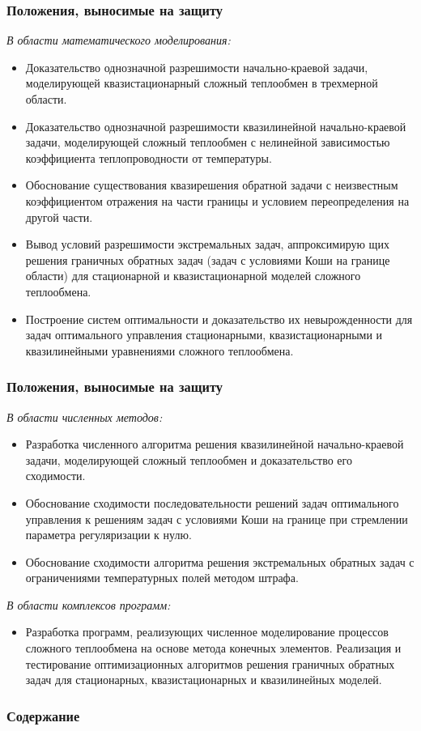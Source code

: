 \begin{frame}
    \frametitle{Положения, выносимые на защиту}
    \textit{В области математического моделирования:}
    \begin{itemize}
        \item Доказательство однозначной разрешимости начально-краевой задачи,
        моделирующей квазистационарный сложный теплообмен в трехмерной
        области.
        \item Доказательство однозначной разрешимости квазилинейной начально-краевой задачи,
        моделирующей сложный теплообмен с нелинейной
        зависимостью коэффициента теплопроводности от температуры.
        \item Обоснование существования квазирешения обратной задачи с неизвестным
        коэффициентом отражения на части границы и условием
        переопределения на другой части.
        \item Вывод условий разрешимости экстремальных задач, аппроксимирую
        щих решения граничных обратных задач (задач с условиями Коши на границе области)
        для стационарной и квазистационарной моделей сложного теплообмена.
        \item Построение систем оптимальности и доказательство их невырожденности
        для задач оптимального управления стационарными, квазистационарными
        и квазилинейными уравнениями сложного теплообмена.
    \end{itemize}
\end{frame}


\begin{frame}
    \frametitle{Положения, выносимые на защиту}
    \textit{В области численных методов:}
    \begin{itemize}
        \item Разработка численного алгоритма решения квазилинейной начально-краевой задачи,
        моделирующей сложный теплообмен и доказательство
        его сходимости.
        \item Обоснование сходимости последовательности решений задач оптимального
        управления к решениям задач с условиями Коши на границе при
        стремлении параметра регуляризации к нулю.
        \item Обоснование сходимости алгоритма решения экстремальных обратных
        задач с ограничениями температурных полей методом штрафа.
    \end{itemize}

    \textit{В области комплексов программ:}
    \begin{itemize}
        \item Разработка программ, реализующих численное моделирование процессов
        сложного теплообмена на основе метода конечных элементов.
        Реализация и тестирование оптимизационных алгоритмов решения
        граничных обратных задач для стационарных, квазистационарных и
        квазилинейных моделей.
    \end{itemize}
\end{frame}

\begin{frame}
    \frametitle{Содержание}
    \tableofcontents
\end{frame}
